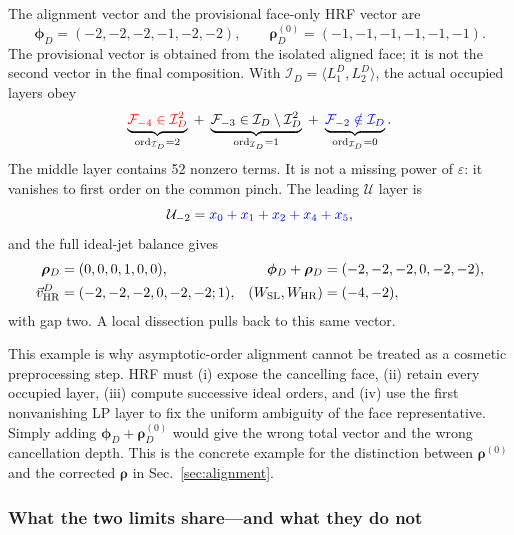 \documentclass[a4paper,11pt]{article}
\newcommand{\WSL}{W_{\rm SL}}
\newcommand{\WHR}{W_{\rm HR}}
\newcommand{\vHR}{\vec v_{\rm HR}}
\newcommand{\ideal}{\mathcal I}
\newcommand{\SLcolour}[1]{{\color{red}#1}}
\newcommand{\HRcolour}[1]{{\color{blue}#1}}
\newcommand{\Othercolour}[1]{{\color{black}#1}}
\begin{document}
The alignment vector and the provisional face-only HRF vector are
\begin{equation}
 \boldsymbol\phi_D=(-2,-2,-2,-1,-2,-2),\qquad
 \boldsymbol\rho_D^{(0)}=(-1,-1,-1,-1,-1,-1).
 \label{eq:dsc-discovery-vectors}
\end{equation}
The provisional vector is obtained from the isolated aligned face; it is not
the second vector in the final composition.  With
\(\ideal_D=\langle L_1^D,L_2^D\rangle\), the actual occupied layers obey
\begin{equation}
 \underbrace{\SLcolour{\mathcal F_{-4}\in\ideal_D^2}}_{
  \operatorname{ord}_{\ideal_D}=2}
 \; +\;
 \underbrace{\Othercolour{\mathcal F_{-3}\in\ideal_D\setminus\ideal_D^2}}_{
  \operatorname{ord}_{\ideal_D}=1}
 \; +\;
 \underbrace{\HRcolour{\mathcal F_{-2}\notin\ideal_D}}_{
  \operatorname{ord}_{\ideal_D}=0}.
 \label{eq:dsc-two-layer-colours}
\end{equation}
The middle layer contains 52 nonzero terms.  It is not a missing power of
\(\varepsilon\): it vanishes to first order on the common pinch.  The leading
\(\mathcal U\) layer is
\begin{equation}
 \mathcal U_{-2}=\HRcolour{x_0+x_1+x_2+x_4+x_5},
 \label{eq:dsc-U-leading}
\end{equation}
and the full ideal-jet balance gives
\begin{align}
 \boldsymbol\rho_D&=(0,0,0,1,0,0),&
 \boldsymbol\phi_D+\boldsymbol\rho_D
   &=(-2,-2,-2,0,-2,-2),\nonumber\\
 \vHR^D&=(-2,-2,-2,0,-2,-2;1),&
 (\WSL,\WHR)&=(-4,-2),
 \label{eq:dsc-vector-example}
\end{align}
with gap two.  A local dissection pulls back to this same vector.

This example is why asymptotic-order alignment cannot be treated as a
cosmetic preprocessing step.  HRF must (i) expose the cancelling face,
(ii) retain every occupied layer, (iii) compute successive ideal orders,
and (iv) use the first nonvanishing LP layer to fix the uniform ambiguity of
the face representative.  Simply adding
\(\boldsymbol\phi_D+\boldsymbol\rho_D^{(0)}\) would give the wrong total
vector and the wrong cancellation depth.  This is the concrete example for
the distinction between \(\boldsymbol\rho^{(0)}\) and the corrected
\(\boldsymbol\rho\) in Sec.~\ref{sec:alignment}.

\subsubsection{What the two limits share---and what they do not}
\end{document}
